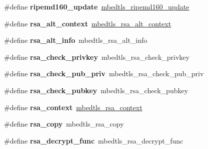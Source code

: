 \begin{DoxyCompactItemize}
\item 
\mbox{\label{compat-1_83_8h_aa73b930a2f0a226903462d92f8d8d286}} 
\#define {\bfseries ripemd160\+\_\+update}~\mbox{\hyperlink{ripemd160_8h_a57d66504c6c3a3677443f5511917498d}{mbedtls\+\_\+ripemd160\+\_\+update}}
\item 
\mbox{\label{compat-1_83_8h_a07acfe5ff08e4652514afdc1673a7333}} 
\#define {\bfseries rsa\+\_\+alt\+\_\+context}~\mbox{\hyperlink{structmbedtls__rsa__alt__context}{mbedtls\+\_\+rsa\+\_\+alt\+\_\+context}}
\item 
\mbox{\label{compat-1_83_8h_a80d9047354fb412e1c44cad683ba3ab5}} 
\#define {\bfseries rsa\+\_\+alt\+\_\+info}~mbedtls\+\_\+rsa\+\_\+alt\+\_\+info
\item 
\mbox{\label{compat-1_83_8h_abf8260fd72bb12a534e1bf2d7461fda9}} 
\#define {\bfseries rsa\+\_\+check\+\_\+privkey}~mbedtls\+\_\+rsa\+\_\+check\+\_\+privkey
\item 
\mbox{\label{compat-1_83_8h_a53617449e08290f38a2e03eb250e8a0b}} 
\#define {\bfseries rsa\+\_\+check\+\_\+pub\+\_\+priv}~mbedtls\+\_\+rsa\+\_\+check\+\_\+pub\+\_\+priv
\item 
\mbox{\label{compat-1_83_8h_afec8c93feadde5baa2b1d3fa5be01bb9}} 
\#define {\bfseries rsa\+\_\+check\+\_\+pubkey}~mbedtls\+\_\+rsa\+\_\+check\+\_\+pubkey
\item 
\mbox{\label{compat-1_83_8h_a295596f3cd34c76e7a66b9ba73de9250}} 
\#define {\bfseries rsa\+\_\+context}~\mbox{\hyperlink{structmbedtls__rsa__context}{mbedtls\+\_\+rsa\+\_\+context}}
\item 
\mbox{\label{compat-1_83_8h_a9788f057f5906d82e7d9b8ee63706a9d}} 
\#define {\bfseries rsa\+\_\+copy}~mbedtls\+\_\+rsa\+\_\+copy
\item 
\mbox{\label{compat-1_83_8h_a336cce629bae843fd442b3b60f9e7d2e}} 
\#define {\bfseries rsa\+\_\+decrypt\+\_\+func}~mbedtls\+\_\+rsa\+\_\+decrypt\+\_\+func
\item 
\mbox{\label{compat-1_83_8h_a49c2a690adb19a435a1edfaf645cea2c}} 

\end{DoxyCompactItemize}
